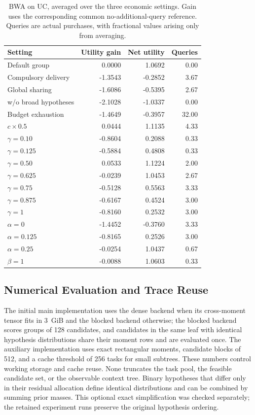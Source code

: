 \documentclass[journal]{IEEEtran}
\newcommand{\smalltable}{\footnotesize\setlength{\tabcolsep}{3.5pt}}
\begin{document}
\begin{table}[t]
\caption{BWA on UC, averaged over the three economic settings. Gain uses the corresponding common no-additional-query reference. Queries are actual purchases, with fractional values arising only from averaging.}
\label{tab:bwa}\centering\smalltable
\begin{tabular}{lrrr}
\toprule
Setting & Utility gain & Net utility & Queries \\
\midrule
Default group & 0.0000 & 1.0692 & 0.00 \\
\midrule
Compulsory delivery & -1.3543 & -0.2852 & 3.67 \\
Global sharing & -1.6086 & -0.5395 & 2.67 \\
w/o broad hypotheses & -2.1028 & -1.0337 & 0.00 \\
Budget exhaustion & -1.4649 & -0.3957 & 32.00 \\
$c\times0.5$ & 0.0444 & 1.1135 & 4.33 \\
$\gamma=0.10$ & -0.8604 & 0.2088 & 0.33 \\
$\gamma=0.125$ & -0.5884 & 0.4808 & 0.33 \\
$\gamma=0.50$ & 0.0533 & 1.1224 & 2.00 \\
$\gamma=0.625$ & -0.0239 & 1.0453 & 2.67 \\
$\gamma=0.75$ & -0.5128 & 0.5563 & 3.33 \\
$\gamma=0.875$ & -0.6167 & 0.4524 & 3.00 \\
$\gamma=1$ & -0.8160 & 0.2532 & 3.00 \\
$\alpha=0$ & -1.4452 & -0.3760 & 3.33 \\
$\alpha=0.125$ & -0.8165 & 0.2526 & 3.00 \\
$\alpha=0.25$ & -0.0254 & 1.0437 & 0.67 \\
$\beta=1$ & -0.0088 & 1.0603 & 0.33 \\
\bottomrule
\end{tabular}

\end{table}

\subsection{Numerical Evaluation and Trace Reuse}
The initial main implementation uses the dense backend when its cross-moment tensor fits in 3~GiB and the blocked backend otherwise; the blocked backend scores groups of 128 candidates, and candidates in the same leaf with identical hypothesis distributions share their moment rows and are evaluated once. The auxiliary implementation uses exact rectangular moments, candidate blocks of 512, and a cache threshold of 256 tasks for small subtrees. These numbers control working storage and cache reuse. None truncates the task pool, the feasible candidate set, or the observable context tree. Binary hypotheses that differ only in their residual allocation define identical distributions and can be combined by summing prior masses. This optional exact simplification was checked separately; the retained experiment runs preserve the original hypothesis ordering.
\end{document}
